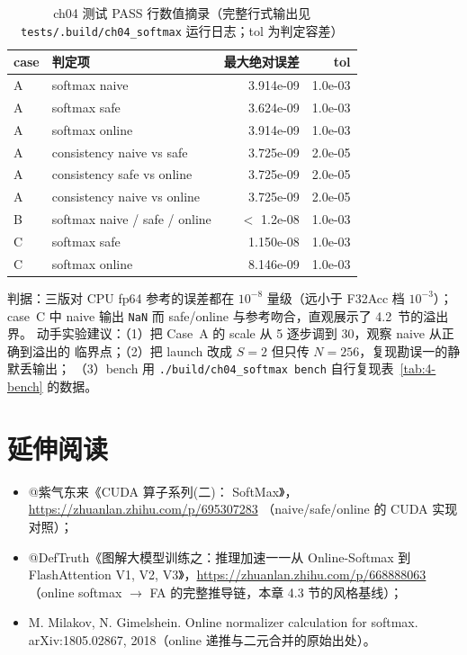 \begin{table}[htbp]
\centering
\caption{ch04 测试 PASS 行数值摘录（完整行式输出见
\texttt{tests/\allowbreak{}.\allowbreak{}build/\allowbreak{}ch04\_\allowbreak{}softmax} 运行日志；tol 为判定容差）}
\label{tab:4-pass}
\begin{tabular}{llrr}
\toprule
case & 判定项 & 最大绝对误差 & tol \\
\midrule
A & softmax naive           & 3.914e-09 & 1.0e-03 \\
A & softmax safe            & 3.624e-09 & 1.0e-03 \\
A & softmax online          & 3.914e-09 & 1.0e-03 \\
A & consistency naive vs safe  & 3.725e-09 & 2.0e-05 \\
A & consistency safe vs online & 3.725e-09 & 2.0e-05 \\
A & consistency naive vs online & 3.725e-09 & 2.0e-05 \\
B & softmax naive / safe / online & $<$ 1.2e-08 & 1.0e-03 \\
C & softmax safe            & 1.150e-08 & 1.0e-03 \\
C & softmax online          & 8.146e-09 & 1.0e-03 \\
\bottomrule
\end{tabular}
\end{table}

判据：三版对 CPU fp64 参考的误差都在 $10^{-8}$ 量级（远小于 F32Acc 档 $10^{-3}$）；
case~C 中 naive 输出 \texttt{NaN} 而 safe/online 与参考吻合，直观展示了 4.2~节的溢出界。
动手实验建议：（1）把 Case~A 的 scale 从 5 逐步调到 30，观察 naive 从正确到溢出的
临界点；（2）把 launch 改成 $S=2$ 但只传 $N=256$，复现勘误一的静默丢输出；
（3）bench 用 \texttt{.\allowbreak{}/\allowbreak{}build/\allowbreak{}ch04\_\allowbreak{}softmax bench} 自行复现表~\ref{tab:4-bench} 的数据。

\section*{延伸阅读}

\begin{itemize}
  \item @紫气东来《CUDA 算子系列(二)： SoftMax》，
        \url{https://zhuanlan.zhihu.com/p/695307283}
        （naive/safe/online 的 CUDA 实现对照）；
  \item @DefTruth《图解大模型训练之：推理加速一一从 Online-Softmax 到 FlashAttention
        V1, V2, V3》，\url{https://zhuanlan.zhihu.com/p/668888063}
        （online softmax $\to$ FA 的完整推导链，本章 4.3 节的风格基线）；
  \item M. Milakov, N. Gimelshein. Online normalizer calculation for softmax.
        arXiv:1805.02867, 2018（online 递推与二元合并的原始出处）。
\end{itemize}
